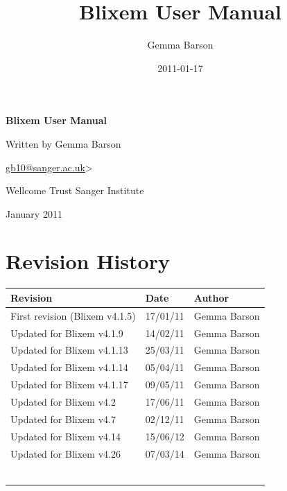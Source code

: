 \documentclass[letterpaper]{article}
\title{Blixem User Manual}
\author{Gemma Barson}
\date{2011-01-17}
\begin{document}
\setcounter{page}{1}\pagestyle{Standard}


\thispagestyle{FirstPage}
{\centering\sffamily\bfseries\color[rgb]{0.0,0.27058825,0.5254902}
\Huge\bf{Blixem User Manual}\par}

\bigskip

{\centering\large{Written by Gemma Barson}\par}
{\centering{\textless}\href{mailto:gb10@sanger.ac.uk}{gb10@sanger.ac.uk}{\textgreater}\par}

\bigskip

{\centering\large{Wellcome Trust Sanger Institute}\par}
{ January 2011\par}



\clearpage
{\color[rgb]{0.0,0.27058825,0.5254902}\section[Revision History]{Revision History}}
\hypertarget{RefHeading334316266717}{}

\begin{center}
\tablehead{}
\begin{supertabular}{|m{8.073cm}|m{3.2849998cm}|m{3.282cm}|}
\hline
\bfseries Revision &
\bfseries Date &
\bfseries Author\\\hline
 First revision (Blixem v4.1.5) &
 17/01/11 &
 Gemma Barson\\\hline
 Updated for Blixem v4.1.9 &
 14/02/11 &
 Gemma Barson\\\hline
 Updated for Blixem v4.1.13 &
 25/03/11 &
 Gemma Barson\\\hline
 Updated for Blixem v4.1.14 &
 05/04/11 &
 Gemma Barson\\\hline
 Updated for Blixem v4.1.17 &
 09/05/11 &
 Gemma Barson\\\hline
 Updated for Blixem v4.2 &
 17/06/11 &
 Gemma Barson\\\hline
 Updated for Blixem v4.7 &
 02/12/11 &
 Gemma Barson\\\hline
 Updated for Blixem v4.14 &
 15/06/12 &
 Gemma Barson\\\hline
 Updated for Blixem v4.26  &
 07/03/14 &
 Gemma Barson\\\hline
 &
 &
 \\\hline
 &
 &
 \\\hline
 &
 &
 \\\hline
 &
 &
 \\\hline
 &
 &
 \\\hline
 &
 &
 \\\hline
\end{supertabular}
\end{center}
\end{document}
